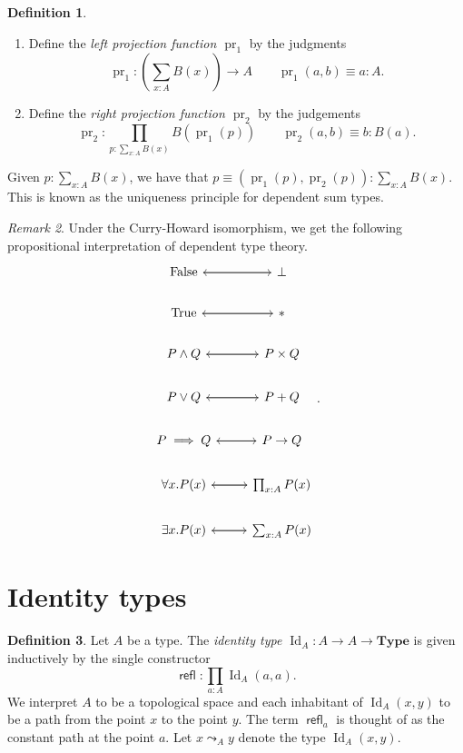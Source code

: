 \documentclass[10pt,letterpaper,cm]{nupset}
\theoremstyle{definition}
\newtheorem{definition}{Definition}[subsection]
\theoremstyle{theorem}
\theoremstyle{remark}
\newtheorem{remark}[definition]{Remark}
\newcommand{\1}{\mathbf{1}}
\newcommand{\0}{\vec 0}
\DeclareMathOperator{\id}{Id}
\DeclareMathOperator{\refl}{\mathsf{refl}}
\DeclareMathOperator{\pr}{pr}
\begin{document}
\begin{definition} $ $
\begin{enumerate}
\item Define the \textit{left projection function $\pr_1$} by the judgments $$\pr_1 : \left (\sum_{x:A}B(x) \right) \to A  \quad \quad \pr_1(a,b) \equiv a: A.$$
\item Define the \textit{right projection function $\pr_2$} by the judgements  $$ \pr_2 : \prod_{p: \sum_{x:A}B(x)} B(\pr_1(p)) \quad \quad \pr_2(a,b) \equiv b :B(a). $$
\end{enumerate}
\end{definition}


Given $p: \sum_{x:A} B(x)$, we have that $p\equiv (\pr_1(p), \pr_2(p)) : \sum_{x:A}B(x)$. This is known as the uniqueness principle for dependent sum types.

\smallskip

\begin{remark}
Under the Curry-Howard isomorphism, we get the following propositional interpretation of dependent type theory.
\[
\begin{tikzcd}
\text{False} \arrow[r] & \bot \arrow[l] \\
\text{True} \arrow[r] & \ast \arrow[l] \\
P \land Q \arrow[r] & P\times Q \arrow[l] \\
P\vee Q \arrow[r] & P + Q \arrow[l] \\
P \implies Q \arrow[r] & P \to Q \arrow[l] \\
\forall x.P(x) \arrow[r] & \prod_{x:A}P(x) \arrow[l] \\
\exists x. P(x) \arrow[r] & \sum_{x:A}P(x) \arrow[l]
\end{tikzcd}
.\]
\end{remark}

\section{Identity types}

\begin{definition}
Let $A$ be a type. The \textit{identity type $\id_A : A \to A \to \mathbf{Type}$} is given inductively  by the single constructor $$\refl : \prod_{a: A} \id_A(a,a).$$ We interpret $A$ to be a topological space and each inhabitant of $\id_A(x,y)$ to be a path from the point $x$ to the point $y$. The term $\refl_a$ is thought of as the constant path at the point $a$. Let $x \leadsto_A y$ denote the type $\id_A(x,y)$.
\end{definition}
\end{document}
